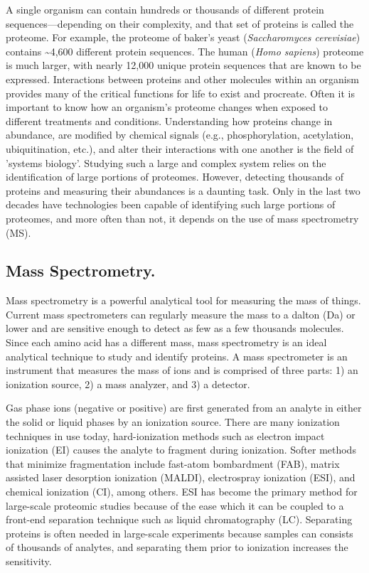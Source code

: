 A single organism can contain hundreds or thousands of different protein sequences---depending on their complexity, and that set of proteins is called the proteome. For example, the proteome of baker's yeast (\emph{Saccharomyces cerevisiae}) contains \textasciitilde4,600 different protein sequences. The human (\emph{Homo sapiens}) proteome is much larger, with nearly 12,000 unique protein sequences that are known to be expressed. Interactions between proteins and other molecules within an organism provides many of the critical functions for life to exist and procreate. Often it is important to know how an organism's proteome changes when exposed to different treatments and conditions. Understanding how proteins change in abundance, are modified by chemical signals (e.g., phosphorylation, acetylation, ubiquitination, etc.), and alter their interactions with one another is the field of 'systems biology'. Studying such a large and complex system relies on the identification of large portions of proteomes. However, detecting thousands of proteins and measuring their abundances is a daunting task. Only in the last two decades have technologies been capable of identifying such large portions of proteomes, and more often than not, it depends on the use of mass spectrometry (MS). 

\subsection*{Mass Spectrometry.}
Mass spectrometry is a powerful analytical tool for measuring the mass of things. Current mass spectrometers can regularly measure the mass to a dalton (Da) or lower and are sensitive enough to detect as few as a few thousands molecules. Since each amino acid has a different mass, mass spectrometry is an ideal analytical technique to study and identify proteins. A mass spectrometer is an instrument that measures the mass of ions and is comprised of three parts: 1) an ionization source, 2) a mass analyzer, and 3) a detector. 

Gas phase ions (negative or positive) are first generated from an analyte in either the solid or liquid phases by an ionization source. There are many ionization techniques in use today, hard-ionization methods such as electron impact ionization (EI)\cite{ei} causes the analyte to fragment during ionization. Softer methods that minimize fragmentation include fast-atom bombardment (FAB)\cite{fab}, matrix assisted laser desorption ionization (MALDI)\cite{maldi}, electrospray ionization (ESI)\cite{esi}, and chemical ionization (CI)\cite{ci}, among others. ESI has become the primary method for large-scale proteomic studies because of the ease which it can be coupled to a front-end separation technique such as liquid chromatography (LC). Separating proteins is often needed in large-scale experiments because samples can consists of thousands of analytes, and separating them prior to ionization increases the sensitivity. 

